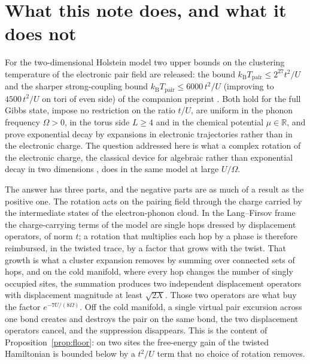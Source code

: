 \documentclass[11pt]{article}
\theoremstyle{plain}
\theoremstyle{definition}
\begin{document}
\begin{abstract}
The bounds are on a clustering temperature of one two-point function inside an
effective state. They are not bounds on a critical temperature, no phase
transition is proved or excluded, and nothing here asserts that a material is a
superconductor. A finite certificate program recomputes every constant; it
produces a certified replay, rejects sixteen corrupted variants of the claimed
inequalities one at a time, and reproduces the two-site numerical checks.
\end{abstract}

\section{What this note does, and what it does not}

For the two-dimensional Holstein model two upper bounds on the clustering
temperature of the electronic pair field are released: the bound
$k_{\mathrm{B}}T_{\mathrm{pair}}\le2^{27}t^{2}/U$ \cite{rens2026a} and the
sharper strong-coupling bound $k_{\mathrm{B}}T_{\mathrm{pair}}\le6000\,t^{2}/U$
(improving to $4500\,t^{2}/U$ on tori of even side) of the companion preprint
\cite{rens2026strong}. Both hold for the full Gibbs state, impose no restriction
on the ratio $t/U$, are uniform in the phonon frequency $\Omega>0$, in the torus
side $L\ge4$ and in the chemical potential $\mu\in\mathbb{R}$, and prove
exponential decay by expansions in electronic trajectories rather than in the
electronic charge. The question addressed here is what a complex rotation of the
electronic charge, the classical device for algebraic rather than exponential
decay in two dimensions \cite{bfu}, does in the same model at large $U/\Omega$.

The answer has three parts, and the negative parts are as much of a result as
the positive one. The rotation acts on the pairing field through the charge
carried by the intermediate states of the electron-phonon cloud. In the
Lang--Firsov frame the charge-carrying terms of the model are single hops dressed
by displacement operators, of norm $t$; a rotation that multiplies each hop by a
phase is therefore reimbursed, in the twisted trace, by a factor that grows with
the twist. That growth is what a cluster expansion removes by summing over
connected sets of hops, and on the cold manifold, where every hop changes the
number of singly occupied sites, the summation produces two independent
displacement operators with displacement magnitude at least $\sqrt{2X}$. Those
two operators are what buy the factor $e^{-7U/(8\Omega)}$. Off the cold
manifold, a single virtual pair excursion across one bond creates and destroys
the pair on the same bond, the two displacement operators cancel, and the
suppression disappears. This is the content of Proposition~\ref{prop:floor}: on
two sites the free-energy gain of the twisted Hamiltonian is bounded below by a
$t^{2}/U$ term that no choice of rotation removes.
\end{document}
